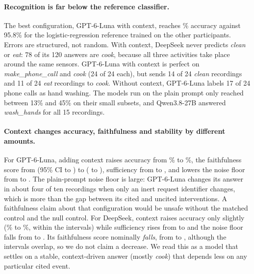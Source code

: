 \documentclass[11pt,a4paper]{article}
\begin{document}
\paragraph{Recognition is far below the reference classifier.} The best configuration, GPT-6-Luna with context, reaches \LunaEnrAcc\% accuracy against 95.8\% for the logistic-regression reference trained on the other participants. Errors are structured, not random. With context, DeepSeek never predicts \emph{clean} or \emph{eat}: 78 of its 120 answers are \emph{cook}, because all three activities take place around the same sensors. GPT-6-Luna with context is perfect on \emph{make\_phone\_call} and \emph{cook} (24 of 24 each), but sends 14 of 24 \emph{clean} recordings and 11 of 24 \emph{eat} recordings to \emph{cook}. Without context, GPT-6-Luna labels 17 of 24 phone calls as hand washing. The models run on the plain prompt only reached between 13\% and 45\% on their small subsets, and Qwen3.8-27B answered \emph{wash\_hands} for all 15 recordings.

\paragraph{Context changes accuracy, faithfulness and stability by different amounts.} For GPT-6-Luna, adding context raises accuracy from \LunaPlAcc\% to \LunaEnrAcc\%, the faithfulness score from \LunaPlF{} (95\% CI \LunaPlFLo{} to \LunaPlFHi) to \LunaEnrF{} (\LunaEnrFLo{} to \LunaEnrFHi), sufficiency from \LunaPlS{} to \LunaEnrS{}, and lowers the noise floor from \LunaPlNoise{} to \LunaEnrNoise. The plain-prompt noise floor is large: GPT-6-Luna changes its answer in about four of ten recordings when only an inert request identifier changes, which is more than the gap between its cited and uncited interventions. A faithfulness claim about that configuration would be unsafe without the matched control and the null control. For DeepSeek, context raises accuracy only slightly (\DeepPlAcc\% to \DeepEnrAcc\%, within the intervals) while sufficiency rises from \DeepPlS{} to \DeepEnrS{} and the noise floor falls from \DeepPlNoise{} to \DeepEnrNoise. Its faithfulness score nominally \emph{falls}, from \DeepPlF{} to \DeepEnrF, although the intervals overlap, so we do not claim a decrease. We read this as a model that settles on a stable, context-driven answer (mostly \emph{cook}) that depends less on any particular cited event.
\end{document}
